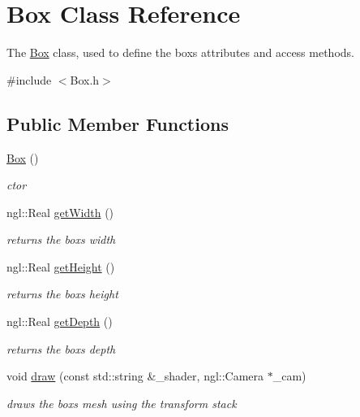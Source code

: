 \hypertarget{class_box}{}\section{Box Class Reference}
\label{class_box}


The \hyperlink{class_box}{Box} class, used to define the box\textquotesingle{}s attributes and access methods.  




{\ttfamily \#include $<$Box.\+h$>$}

\subsection*{Public Member Functions}
\begin{DoxyCompactItemize}
\item 
\hypertarget{class_box_aca78d7db44972bfa78d46b7bbc8796f6}{}\hyperlink{class_box_aca78d7db44972bfa78d46b7bbc8796f6}{Box} ()\label{class_box_aca78d7db44972bfa78d46b7bbc8796f6}

\begin{DoxyCompactList}\small\item\em ctor \end{DoxyCompactList}\item 
\hypertarget{class_box_a00b3e37cb5fba4097557ea9d9074d89f}{}ngl\+::\+Real \hyperlink{class_box_a00b3e37cb5fba4097557ea9d9074d89f}{get\+Width} ()\label{class_box_a00b3e37cb5fba4097557ea9d9074d89f}

\begin{DoxyCompactList}\small\item\em returns the box\textquotesingle{}s width \end{DoxyCompactList}\item 
\hypertarget{class_box_abc7c98fba087aceb295cf1629eab6450}{}ngl\+::\+Real \hyperlink{class_box_abc7c98fba087aceb295cf1629eab6450}{get\+Height} ()\label{class_box_abc7c98fba087aceb295cf1629eab6450}

\begin{DoxyCompactList}\small\item\em returns the box\textquotesingle{}s height \end{DoxyCompactList}\item 
\hypertarget{class_box_af8499ad434a289212dd226ed540e1180}{}ngl\+::\+Real \hyperlink{class_box_af8499ad434a289212dd226ed540e1180}{get\+Depth} ()\label{class_box_af8499ad434a289212dd226ed540e1180}

\begin{DoxyCompactList}\small\item\em returns the box\textquotesingle{}s depth \end{DoxyCompactList}\item 
void \hyperlink{class_box_adb7764c39ba17be6c83364c8284c263a}{draw} (const std\+::string \&\+\_\+shader, ngl\+::\+Camera $\ast$\+\_\+cam)
\begin{DoxyCompactList}\small\item\em draws the box\textquotesingle{}s mesh using the transform stack \end{DoxyCompactList}\end{DoxyCompactItemize}


